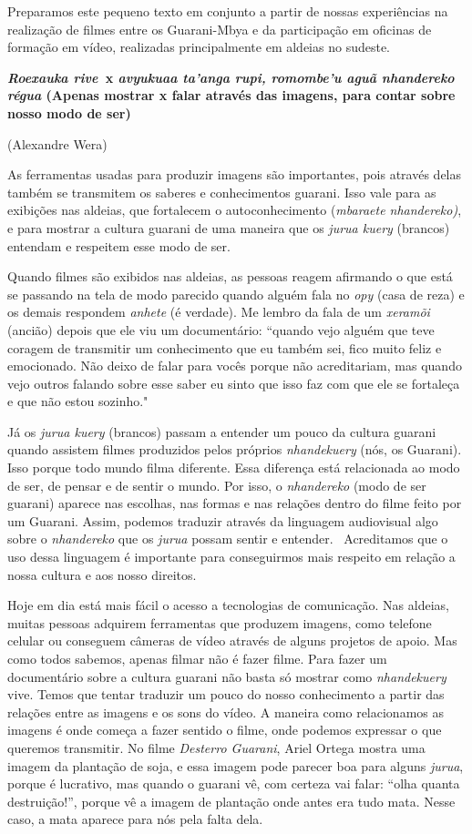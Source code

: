 Preparamos este pequeno texto em conjunto a partir de nossas
experiências na realização de filmes entre os Guarani-Mbya e da
participação em oficinas de formação em vídeo, realizadas principalmente
em aldeias no sudeste.

\textbf{\emph{Roexauka rive~}x \emph{avyukuaa ta'anga rupi, romombe'u
aguã nhandereko régua} (Apenas mostrar x falar através das imagens, para
contar sobre nosso modo de ser)}

(Alexandre Wera)

As ferramentas usadas para produzir imagens são importantes, pois
através delas também se transmitem os saberes e conhecimentos guarani.
Isso vale para as exibições nas aldeias, que fortalecem o
autoconhecimento (\emph{mbaraete nhandereko)}, e para mostrar a cultura
guarani de uma maneira que os \emph{jurua kuery} (brancos) entendam e
respeitem esse modo de ser.

Quando filmes são exibidos nas aldeias, as pessoas reagem afirmando o
que está se passando na tela de modo parecido quando alguém fala no
\emph{opy} (casa de reza) e os demais respondem \emph{anhete} (é
verdade). Me lembro da fala de um \emph{xeramõi} (ancião) depois que ele
viu um documentário: ``quando vejo alguém que teve coragem de transmitir
um conhecimento que eu também sei, fico muito feliz e emocionado. Não
deixo de falar para vocês porque não acreditariam, mas quando vejo
outros falando sobre esse saber eu sinto que isso faz com que ele se
fortaleça e que não estou sozinho."

Já os \emph{jurua kuery} (brancos) passam a entender um pouco da cultura
guarani quando assistem filmes produzidos pelos próprios
\emph{nhandekuery} (nós, os Guarani). Isso porque todo mundo filma
diferente. Essa diferença está relacionada ao modo de ser, de pensar e
de sentir o mundo. Por isso, o \emph{nhandereko} (modo de ser guarani)
aparece nas escolhas, nas formas e nas relações dentro do filme feito
por um Guarani. Assim, podemos traduzir através da linguagem audiovisual
algo sobre o \emph{nhandereko} que os \emph{jurua} possam sentir e
entender.~ Acreditamos que o uso dessa linguagem é importante para
conseguirmos mais respeito em relação a nossa cultura e aos nosso
direitos.

Hoje em dia está mais fácil o acesso a tecnologias de comunicação. Nas
aldeias, muitas pessoas adquirem ferramentas que produzem imagens, como
telefone celular ou conseguem câmeras de vídeo através de alguns
projetos de apoio. Mas como todos sabemos, apenas filmar não é fazer
filme. Para fazer um documentário sobre a cultura guarani não basta só
mostrar como \emph{nhandekuery} vive. Temos que tentar traduzir um pouco
do nosso conhecimento a partir das relações entre as imagens e os sons
do vídeo. A maneira como relacionamos as imagens é onde começa a fazer
sentido o filme, onde podemos expressar o que queremos transmitir. No
filme \emph{Desterro Guarani}, Ariel Ortega mostra uma imagem da
plantação de soja, e essa imagem pode parecer boa para alguns
\emph{jurua}, porque é lucrativo, mas quando o guarani vê, com certeza
vai falar: ``olha quanta destruição!'', porque vê a imagem de plantação
onde antes era tudo mata. Nesse caso, a mata aparece para nós pela falta
dela.


